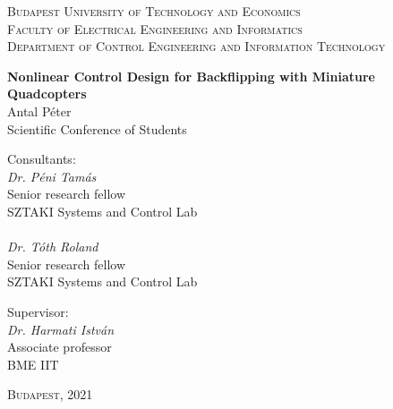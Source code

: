 \begin{center}
{\textsc{Budapest University of Technology and Economics\\Faculty of Electrical Engineering and Informatics\\Department of Control Engineering and Information Technology}}


{\Large\textbf{Nonlinear Control Design for Backflipping with Miniature Quadcopters\\}}
{\Large{Antal Péter\\}}
{\large{Scientific Conference of Students\\}}
\end{center}



\begin{minipage}[t]{0.52\linewidth}
Consultants:\\
\forceindent \textit{Dr. Péni Tamás}\\
\forceindent Senior research fellow\\
\forceindent SZTAKI Systems and Control Lab\\
\phantom{o}\\
\forceindent \textit{Dr. Tóth Roland}\\
\forceindent Senior research fellow\\
\forceindent SZTAKI Systems and Control Lab
\end{minipage}\begin{minipage}[t]{0.48\linewidth}
Supervisor:\\
\forceindent \textit{Dr. Harmati István}\\
\forceindent Associate professor\\
\forceindent BME IIT
\end{minipage} 


		
\begin{center}
{\large\textsc{Budapest, }2021 }
\end{center}
